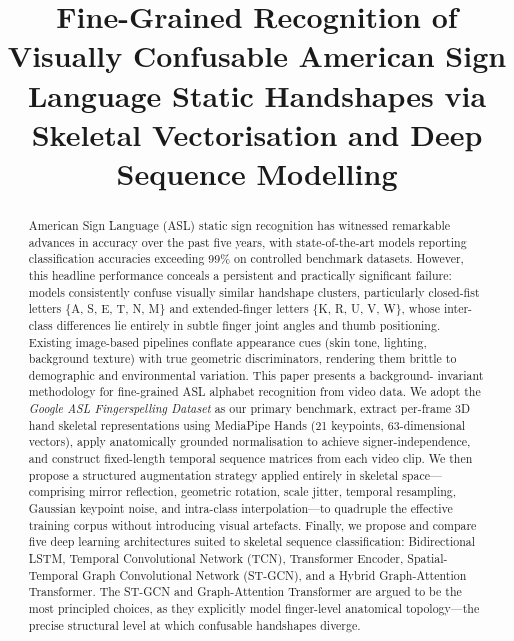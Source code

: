\documentclass[conference]{IEEEtran}
\begin{document}
\title{Fine-Grained Recognition of Visually Confusable American Sign Language
Static Handshapes via Skeletal Vectorisation and Deep Sequence Modelling}

\author{
  \and
}

\maketitle

\begin{abstract}
American Sign Language (ASL) static sign recognition has witnessed remarkable
advances in accuracy over the past five years, with state-of-the-art models
reporting classification accuracies exceeding 99\% on controlled benchmark
datasets. However, this headline performance conceals a persistent and
practically significant failure: models consistently confuse visually similar
handshape clusters, particularly closed-fist letters \{A, S, E, T, N, M\} and
extended-finger letters \{K, R, U, V, W\}, whose inter-class differences lie
entirely in subtle finger joint angles and thumb positioning. Existing
image-based pipelines conflate appearance cues (skin tone, lighting, background
texture) with true geometric discriminators, rendering them brittle to
demographic and environmental variation. This paper presents a background-
invariant methodology for fine-grained ASL alphabet recognition from video data.
We adopt the \textit{Google ASL Fingerspelling Dataset} as our primary benchmark,
extract per-frame 3D hand skeletal representations using MediaPipe Hands (21
keypoints, 63-dimensional vectors), apply anatomically grounded normalisation to
achieve signer-independence, and construct fixed-length temporal sequence
matrices from each video clip. We then propose a structured augmentation
strategy applied entirely in skeletal space---comprising mirror reflection,
geometric rotation, scale jitter, temporal resampling, Gaussian keypoint noise,
and intra-class interpolation---to quadruple the effective training corpus
without introducing visual artefacts. Finally, we propose and compare five deep
learning architectures suited to skeletal sequence classification: Bidirectional
LSTM, Temporal Convolutional Network (TCN), Transformer Encoder, Spatial-
Temporal Graph Convolutional Network (ST-GCN), and a Hybrid Graph-Attention
Transformer. The ST-GCN and Graph-Attention Transformer are argued to be the
most principled choices, as they explicitly model finger-level anatomical
topology---the precise structural level at which confusable handshapes diverge.
\end{abstract}
\end{document}
